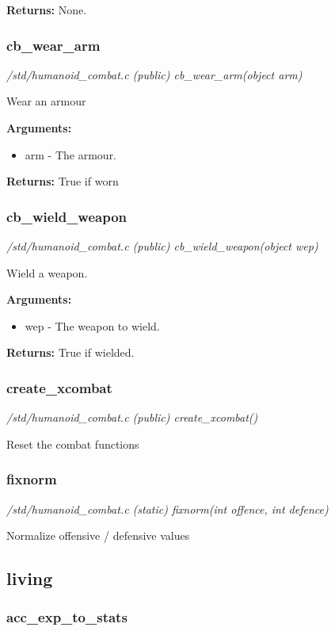 {\bf Returns:}        None.


\subsubsection{cb\_wear\_arm}

{\em /std/humanoid\_combat.c (public) cb\_wear\_arm(object arm)}

Wear an armour

{\bf Arguments:}
\begin{itemize}
\item     arm - The armour.
\end{itemize}

{\bf Returns:}        True if worn


\subsubsection{cb\_wield\_weapon}

{\em /std/humanoid\_combat.c (public) cb\_wield\_weapon(object wep)}

Wield a weapon.

{\bf Arguments:}
\begin{itemize}
\item     wep - The weapon to wield.
\end{itemize}

{\bf Returns:}        True if wielded.


\subsubsection{create\_xcombat}

{\em /std/humanoid\_combat.c (public) create\_xcombat()}

Reset the combat functions


\subsubsection{fixnorm}

{\em /std/humanoid\_combat.c (static) fixnorm(int offence, int defence)}

Normalize offensive / defensive values


\subsection{living}
\subsubsection{acc\_exp\_to\_stats}

